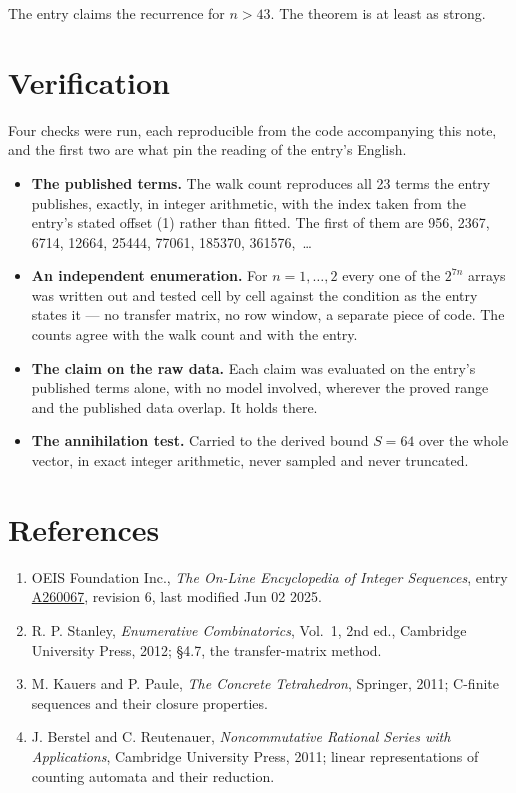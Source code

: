 \documentclass[11pt]{article}
\theoremstyle{definition}
\begin{document}
The entry claims the recurrence for $n > 43$. The theorem is at least as strong.

\section{Verification}

Four checks were run, each reproducible from the code accompanying this note, and the first two are what pin the reading of the entry's English.

\begin{itemize}

\item {\bfseries The published terms.} The walk count reproduces all 23 terms the entry publishes, exactly, in integer arithmetic, with the index taken from the entry's stated offset (1) rather than fitted. The first of them are 956, 2367, 6714, 12664, 25444, 77061, 185370, 361576,~\dots

\item {\bfseries An independent enumeration.} For $n = 1,\dots,2$ every one of the $2^{7n}$ arrays was written out and tested cell by cell against the condition as the entry states it --- no transfer matrix, no row window, a separate piece of code. The counts agree with the walk count and with the entry.

\item {\bfseries The claim on the raw data.} Each claim was evaluated on the entry's published terms alone, with no model involved, wherever the proved range and the published data overlap. It holds there.

\item {\bfseries The annihilation test.} Carried to the derived bound $S = 64$ over the whole vector, in exact integer arithmetic, never sampled and never truncated.

\end{itemize}

\section{References}

\begin{enumerate}

\item OEIS Foundation Inc., \emph{The On-Line Encyclopedia of Integer Sequences}, entry \href{https://oeis.org/A260067}{A260067}, revision 6, last modified Jun 02 2025.

\item R. P. Stanley, \emph{Enumerative Combinatorics}, Vol.~1, 2nd ed., Cambridge University Press, 2012; \S4.7, the transfer-matrix method.

\item M. Kauers and P. Paule, \emph{The Concrete Tetrahedron}, Springer, 2011; C-finite sequences and their closure properties.

\item J. Berstel and C. Reutenauer, \emph{Noncommutative Rational Series with Applications}, Cambridge University Press, 2011; linear representations of counting automata and their reduction.

\end{enumerate}
\end{document}
